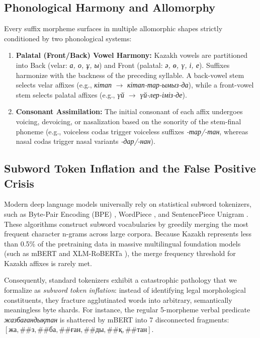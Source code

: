 \subsection{Phonological Harmony and Allomorphy}
Every suffix morpheme surfaces in multiple allomorphic shapes strictly conditioned by two phonological systems:
\begin{enumerate}
    \item \textbf{Palatal (Front/Back) Vowel Harmony:} Kazakh vowels are partitioned into Back (velar: \textit{а, о, ұ, ы}) and Front (palatal: \textit{ә, ө, ү, і, е}). Suffixes harmonize with the backness of the preceding syllable. A back-vowel stem selects velar affixes (e.g., \textit{кітап} $\rightarrow$ \textit{кітап-тар-ымыз-да}), while a front-vowel stem selects palatal affixes (e.g., \textit{үй} $\rightarrow$ \textit{үй-лер-іміз-де}).
    \item \textbf{Consonant Assimilation:} The initial consonant of each affix undergoes voicing, devoicing, or nasalization based on the sonority of the stem-final phoneme (e.g., voiceless codas trigger voiceless suffixes \textit{-тар/-тан}, whereas nasal codas trigger nasal variants \textit{-дар/-нан}).
\end{enumerate}

\subsection{Subword Token Inflation and the False Positive Crisis}
Modern deep language models universally rely on statistical subword tokenizers, such as Byte-Pair Encoding (BPE) \citep{sennrich2016subword}, WordPiece \citep{devlin2019bert}, and SentencePiece Unigram \citep{kudo2018sentencepiece}. These algorithms construct subword vocabularies by greedily merging the most frequent character n-grams across large corpora. Because Kazakh represents less than 0.5\% of the pretraining data in massive multilingual foundation models (such as mBERT \citep{devlin2019bert} and XLM-RoBERTa \citep{conneau2020xlmr}), the merge frequency threshold for Kazakh affixes is rarely met.

Consequently, standard tokenizers exhibit a catastrophic pathology that we formalize as \textit{subword token inflation}: instead of identifying legal morphological constituents, they fracture agglutinated words into arbitrary, semantically meaningless byte shards. For instance, the regular 5-morpheme verbal predicate \textit{жазбағандықтан} is shattered by mBERT into 7 disconnected fragments: $[\textit{жа}, \textit{\#\#з}, \textit{\#\#ба}, \textit{\#\#ған}, \textit{\#\#ды}, \textit{\#\#қ}, \textit{\#\#тан}]$.

